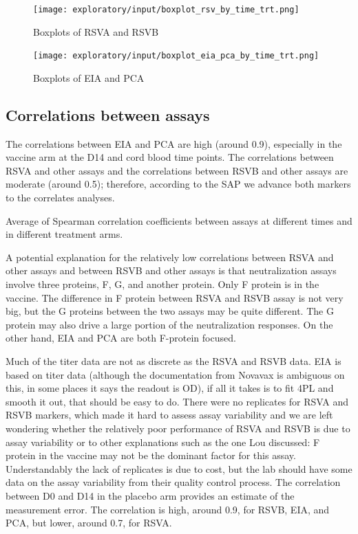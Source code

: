 \documentclass[11pt]{article}
\begin{document}
\begin{figure}[H]
    \centering
    \texttt{[image: exploratory/input/boxplot\_rsv\_by\_time\_trt.png]}
    \caption{Boxplots of RSVA and RSVB}
\end{figure}

\begin{figure}[H]
    \centering
    \texttt{[image: exploratory/input/boxplot\_eia\_pca\_by\_time\_trt.png]}
    \caption{Boxplots of EIA and PCA}
\end{figure}

\clearpage

\hypertarget{correlations-between-assays}{%
\subsection{Correlations between assays}\label{correlations-between-assays}}

The correlations between EIA and PCA are high (around 0.9), especially in the vaccine arm at the D14 and cord blood time points. The correlations between RSVA and other assays and the correlations between RSVB and other assays are moderate (around 0.5); therefore, according to the SAP we advance both markers to the correlates analyses.

\begin{table}[H]
    \centering
    
    \caption{Average of Spearman correlation coefficients between assays at different times and in different treatment arms.}
\end{table}

A potential explanation for the relatively low correlations between RSVA and other assays and between RSVB and other assays is that neutralization assays involve three proteins, F, G, and another protein. Only F protein is in the vaccine. The difference in F protein between RSVA and RSVB assay is not very big, but the G proteins between the two assays may be quite different. The G protein may also drive a large portion of the neutralization responses. On the other hand, EIA and PCA are both F-protein focused.

Much of the titer data are not as discrete as the RSVA and RSVB data. EIA is based on titer data (although the documentation from Novavax is ambiguous on this, in some places it says the readout is OD), if all it takes is to fit 4PL and smooth it out, that should be easy to do.
There were no replicates for RSVA and RSVB markers, which made it hard to assess assay variability and we are left wondering whether the relatively poor performance of RSVA and RSVB is due to assay variability or to other explanations such as the one Lou discussed: F protein in the vaccine may not be the dominant factor for this assay. Understandably the lack of replicates is due to cost, but the lab should have some data on the assay variability from their quality control process.
The correlation between D0 and D14 in the placebo arm provides an estimate of the measurement error. The correlation is high, around 0.9, for RSVB, EIA, and PCA, but lower, around 0.7, for RSVA.
\end{document}
